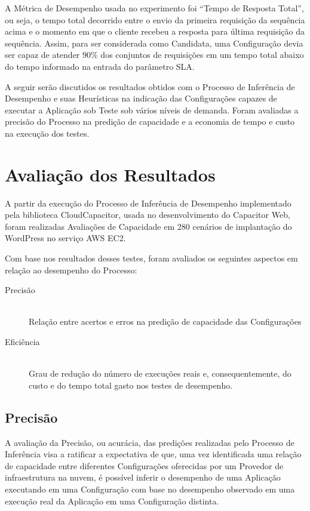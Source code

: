 A Métrica de Desempenho usada no experimento foi ``Tempo de Resposta Total'', ou 
seja, o tempo total decorrido entre o envio da primeira requisição da sequência 
acima e o momento em que o cliente recebeu a resposta para última requisição da
sequência. Assim, para ser considerada como Candidata, uma Configuração devia 
ser capaz de atender 90\% dos conjuntos de requisições em um tempo total abaixo 
do tempo informado na entrada do parâmetro SLA.

A seguir serão discutidos os resultados obtidos com o Processo de Inferência de 
Desempenho e suas Heurísticas na indicação das Configurações capazes de executar
a Aplicação sob Teste sob vários níveis de demanda. Foram avaliadas a precisão do 
Processo na predição de capacidade e a economia de tempo e custo na execução
dos testes.

\section{Avaliação dos Resultados}
\label{sec:resultados_avaliacao}
A partir da execução do Processo de Inferência de Desempenho implementado pela
biblioteca CloudCapacitor, usada no desenvolvimento do Capacitor Web, foram 
realizadas Avaliações de Capacidade em 280 cenários de implantação do WordPress 
no serviço AWS EC2.

Com base nos resultados desses testes, foram avaliados os seguintes aspectos em
relação ao desempenho do Processo: 

\begin{description}
  \item[Precisão] \hfill \\ Relação entre acertos e erros na predição de 
  capacidade das Configurações    
  \item[Eficiência] \hfill \\ Grau de redução do número de execuções reais e,
  consequentemente, do custo e do tempo total gasto nos testes de desempenho.
\end{description}

\subsection{Precisão}
\label{subsec:resultados_precisao}
A avaliação da Precisão, ou acurácia, das predições realizadas pelo Processo
de Inferência visa a ratificar a expectativa de que, uma vez identificada uma
relação de capacidade entre diferentes Configurações oferecidas por um Provedor
de infraestrutura na nuvem, é possível inferir o desempenho de uma Aplicação
executando em uma Configuração com base no desempenho observado em uma
execução real da Aplicação em uma Configuração distinta.

